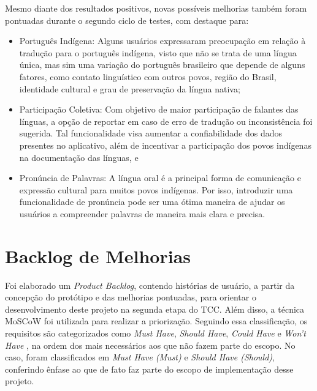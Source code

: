 Mesmo diante dos resultados positivos, novas possíveis melhorias também foram pontuadas durante o segundo ciclo de testes, com destaque para:

\begin{itemize}
	\item Português Indígena: Alguns usuários expressaram preocupação em relação à tradução para o português indígena, visto que não se trata de uma língua única, mas sim uma variação do português brasileiro que depende de alguns fatores, como contato linguístico com outros 
	povos, região do Brasil, identidade cultural e grau de preservação da língua nativa;
	\item Participação Coletiva: Com objetivo de maior participação de falantes das línguas, a opção de reportar em caso de erro de tradução ou inconsistência foi sugerida. Tal funcionalidade visa aumentar a confiabilidade dos dados presentes no aplicativo, além de incentivar a 
	participação dos povos indígenas na documentação das línguas, e
	\item Pronúncia de Palavras: A língua oral é a principal forma de comunicação e expressão cultural para muitos povos indígenas. Por isso, introduzir uma funcionalidade de pronúncia pode ser uma ótima maneira de ajudar os usuários a compreender palavras de maneira mais clara 
	e precisa.
\end{itemize}

\section{Backlog de Melhorias}
\label{sec:Backlog de Melhorias}
Foi elaborado um \textit{Product Backlog}, contendo histórias de usuário, a partir da concepção do protótipo e das melhorias pontuadas, para orientar o desenvolvimento deste projeto na segunda etapa do TCC. Além disso, a técnica MoSCoW foi utilizada para realizar a priorização. Seguindo essa classificação, 
os requisitos são categorizados como \textit{Must Have}, \textit{Should Have}, \textit{Could Have} e \textit{Won't Have} \cite{miranda2021}, na ordem dos mais necessários aos que não fazem parte do escopo. No caso, foram classificados em \textit{Must Have (Must)} e \textit{Should Have (Should)}, conferindo ênfase ao que de 
fato faz parte do escopo de implementação desse projeto.


